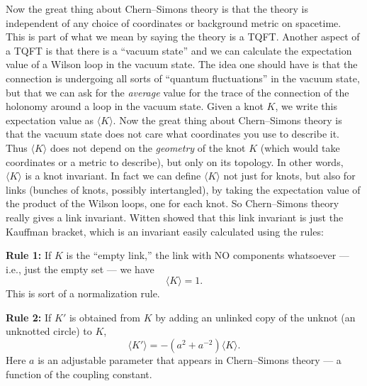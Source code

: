 \documentclass{article}
\begin{document}
Now the great thing about Chern--Simons theory is that the theory is
independent of any choice of coordinates or background metric on
spacetime. This is part of what we mean by saying the theory is a TQFT.
Another aspect of a TQFT is that there is a ``vacuum state'' and we can
calculate the expectation value of a Wilson loop in the vacuum state.
The idea one should have is that the connection is undergoing all sorts
of ``quantum fluctuations'' in the vacuum state, but that we can ask for
the \emph{average} value for the trace of the connection of the holonomy
around a loop in the vacuum state. Given a knot \(K\), we write this
expectation value as \(\langle K \rangle\). Now the great thing about
Chern--Simons theory is that the vacuum state does not care what
coordinates you use to describe it. Thus \(\langle K \rangle\) does not
depend on the \emph{geometry} of the knot \(K\) (which would take
coordinates or a metric to describe), but only on its topology. In other
words, \(\langle K \rangle\) is a knot invariant. In fact we can define
\(\langle K \rangle\) not just for knots, but also for links (bunches of
knots, possibly intertangled), by taking the expectation value of the
product of the Wilson loops, one for each knot. So Chern--Simons theory
really gives a link invariant. Witten showed that this link invariant is
just the Kauffman bracket, which is an invariant easily calculated using
the rules:

\textbf{Rule 1:} If \(K\) is the ``empty link,'' the link with NO
components whatsoever --- i.e., just the empty set --- we have
\[\langle K \rangle = 1.\] This is sort of a normalization rule.

\textbf{Rule 2:} If \(K'\) is obtained from \(K\) by adding an unlinked
copy of the unknot (an unknotted circle) to \(K\),
\[\langle K' \rangle = -(a^2 + a^{-2})\langle K \rangle.\] Here \(a\) is
an adjustable parameter that appears in Chern--Simons theory --- a
function of the coupling constant.
\end{document}
